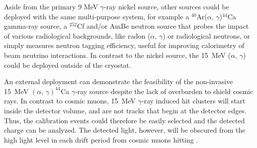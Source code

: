 Aside from the primary 
9 MeV $\gamma$-ray nickel source, other sources could be deployed with the same multi-purpose system, for example a $^{40}$Ar($\alpha,\,\gamma$)$^{44}$Ca gamma-ray source, a $^{252}$Cf and/or AmBe neutron source that probes the impact of various radiological backgrounds, like radon ($\alpha,\,\gamma$) or radiological neutrons, or simply measures neutron tagging efficiency, useful for improving calorimetry of beam neutrino interactions. 
In contrast to the nickel source, the \SI{15}{\MeV} ($\alpha,\,\gamma$) could be deployed outside of the cryostat.


An external  deployment can demonstrate the feasibility of the non-invasive \SI{15}{MeV} $(\alpha,\,\gamma)^{44}$Ca $\gamma$-ray source despite the lack of overburden to shield cosmic rays. In contrast to cosmic muons, \SI{15}{MeV} $\gamma$-ray induced hit clusters will start inside the detector volume, and are not tracks that begin at the detector edges. Thus, the  calibration events could therefore be easily selected and the detected charge can be analyzed. The detected light, however, will be obscured from the high light level in each drift period from cosmic muons hitting . 

